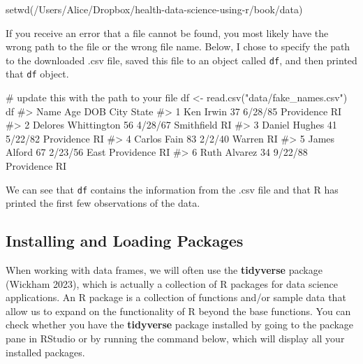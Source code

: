 \documentclass[
  letterpaper,
]{krantz}
\makeatletter
\newenvironment{Shaded}{\begin{snugshade}}{\end{snugshade}}
\newcommand{\CommentTok}[1]{\textcolor[rgb]{0.37,0.37,0.37}{#1}}
\newcommand{\FunctionTok}[1]{\textcolor[rgb]{0.28,0.35,0.67}{#1}}
\newcommand{\NormalTok}[1]{\textcolor[rgb]{0.00,0.23,0.31}{#1}}
\newcommand{\OtherTok}[1]{\textcolor[rgb]{0.00,0.23,0.31}{#1}}
\newcommand{\StringTok}[1]{\textcolor[rgb]{0.13,0.47,0.30}{#1}}
\newenvironment{kframe}{%
\medskip{}
\setlength{\fboxsep}{.8em}
 \def\at@end@of@kframe{}%
 \ifinner\ifhmode%
  \def\at@end@of@kframe{\end{minipage}}%
  \begin{minipage}{\columnwidth}%
 \fi\fi%
 \def\FrameCommand##1{\hskip\@totalleftmargin \hskip-\fboxsep
 \colorbox{shadecolor}{##1}\hskip-\fboxsep
     \hskip-\linewidth \hskip-\@totalleftmargin \hskip\columnwidth}%
 \MakeFramed {\advance\hsize-\width
   \@totalleftmargin\z@ \linewidth\hsize
   \@setminipage}}%
 {\par\unskip\endMakeFramed%
 \at@end@of@kframe}
\renewenvironment{Shaded}{\begin{kframe}}{\end{kframe}}
\makeatother
\begin{document}
\begin{Shaded}
\begin{Highlighting}[]
\FunctionTok{setwd}\NormalTok{(}\StringTok{\textquotesingle{}/Users/Alice/Dropbox/health{-}data{-}science{-}using{-}r/book/data\textquotesingle{}}\NormalTok{)}
\end{Highlighting}
\end{Shaded}

If you receive an error that a file cannot be found, you most likely
have the wrong path to the file or the wrong file name. Below, I chose
to specify the path to the downloaded .csv file, saved this file to an
object called \texttt{df}, and then printed that \texttt{df} object.

\begin{Shaded}
\begin{Highlighting}[]
\CommentTok{\# update this with the path to your file}
\NormalTok{df }\OtherTok{\textless{}{-}} \FunctionTok{read.csv}\NormalTok{(}\StringTok{"data/fake\_names.csv"}\NormalTok{) }
\NormalTok{df}
\CommentTok{\#\textgreater{}                  Name Age     DOB            City State}
\CommentTok{\#\textgreater{} 1           Ken Irwin  37 6/28/85      Providence    RI}
\CommentTok{\#\textgreater{} 2 Delores Whittington  56 4/28/67      Smithfield    RI}
\CommentTok{\#\textgreater{} 3       Daniel Hughes  41 5/22/82      Providence    RI}
\CommentTok{\#\textgreater{} 4         Carlos Fain  83  2/2/40          Warren    RI}
\CommentTok{\#\textgreater{} 5        James Alford  67 2/23/56 East Providence    RI}
\CommentTok{\#\textgreater{} 6        Ruth Alvarez  34 9/22/88      Providence    RI}
\end{Highlighting}
\end{Shaded}

We can see that \texttt{df} contains the information from the .csv file
and that R has printed the first few observations of the data.

\subsection{Installing and Loading
Packages}\label{installing-and-loading-packages}

When working with data frames, we will often use the \textbf{tidyverse}
package (Wickham 2023), which is actually a collection of R packages for
data science applications. An R package is a collection of functions
and/or sample data that allow us to expand on the functionality of R
beyond the base functions. You can check whether you have the
\textbf{tidyverse} package installed by going to the package pane in
RStudio or by running the command below, which will display all your
installed packages.
\end{document}
